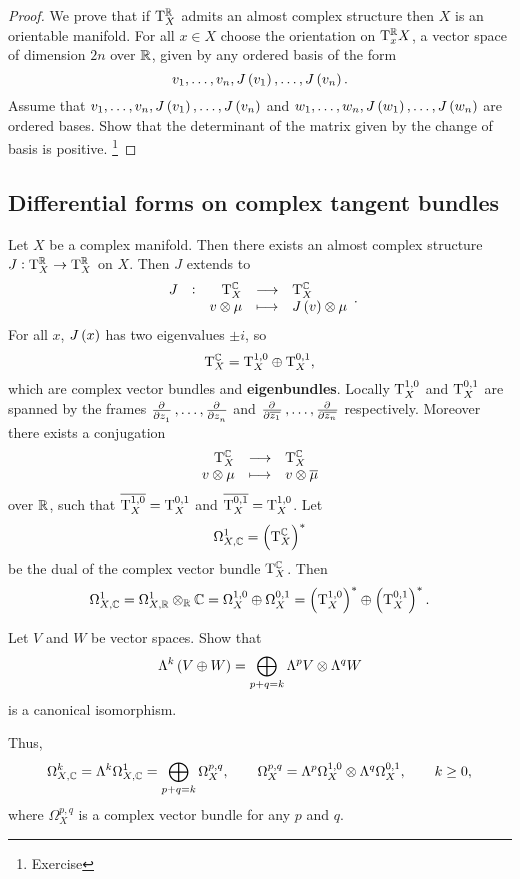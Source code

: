 \begin{proof}
We prove that if $ \mathrm{T}_X^{\mathbb{R}} $ admits an almost complex structure then $ X $ is an orientable manifold. For all $ x \in X $ choose the orientation on $ \mathrm{T}_x^{\mathbb{R}} X $, a vector space of dimension $ 2n $ over $ \mathbb{R} $, given by any ordered basis of the form
$$ v_1, \dots, v_n, J\br{v_1}, \dots, J\br{v_n}. $$
Assume that $ v_1, \dots, v_n, J\br{v_1}, \dots, J\br{v_n} $ and $ w_1, \dots, w_n, J\br{w_1}, \dots, J\br{w_n} $ are ordered bases. Show that the determinant of the matrix given by the change of basis is positive. \footnote{Exercise}
\end{proof}

\pagebreak

\subsection{Differential forms on complex tangent bundles}

Let $ X $ be a complex manifold. Then there exists an almost complex structure $ J : \mathrm{T}_X^{\mathbb{R}} \to \mathrm{T}_X^{\mathbb{R}} $ on $ X $. Then $ J $ extends to
$$ \function[J]{\T_X^\CC}{\T_X^\CC}{v \otimes \mu}{J\br{v} \otimes \mu}. $$
For all $ x $, $ J\br{x} $ has two eigenvalues $ \pm i $, so
$$ \mathrm{T}_X^{\mathbb{C}} = \mathrm{T}_X^{1, 0} \oplus \mathrm{T}_X^{0, 1}, $$
which are complex vector bundles and \textbf{eigenbundles}. Locally $ \mathrm{T}_X^{1, 0} $ and $ \mathrm{T}_X^{0, 1} $ are spanned by the frames $ \tpd{}{z_1}, \dots, \tpd{}{z_n} $ and $ \tpd{}{\overline{z_1}}, \dots, \tpd{}{\overline{z_n}} $ respectively. Moreover there exists a conjugation
$$ \function{\T_X^\CC}{\T_X^\CC}{v \otimes \mu}{v \otimes \overline{\mu}} $$
over $ \mathbb{R} $, such that $ \overline{\mathrm{T}_X^{1, 0}} = \mathrm{T}_X^{0, 1} $ and $ \overline{\mathrm{T}_X^{0, 1}} = \mathrm{T}_X^{1, 0} $. Let
$$ \Omega_{X, \CC}^1 = \br{\T_X^\CC}^* $$
be the dual of the complex vector bundle $ \mathrm{T}_X^{\mathbb{C}} $. Then
$$ \Omega_{X, \CC}^1 = \Omega_{X, \RR}^1 \otimes_\RR \CC = \Omega_X^{1, 0} \oplus \Omega_X^{0, 1} = \br{\T_X^{1, 0}}^* \oplus \br{\T_X^{0, 1}}^*. $$

\begin{exercise*}
Let $ V $ and $ W $ be vector spaces. Show that
$$ \Lambda^k\br{V \oplus W} = \bigoplus_{p + q = k} \Lambda^pV \otimes \Lambda^qW $$
is a canonical isomorphism.
\end{exercise*}


Thus,
$$ \Omega_{X, \mathbb{C}}^k = \Lambda^k\Omega_{X, \mathbb{C}}^1 = \bigoplus_{p + q = k} \Omega_X^{p, q}, \qquad \Omega_X^{p, q} = \Lambda^p\Omega_X^{1, 0} \otimes \Lambda^q\Omega_X^{0, 1}, \qquad k \ge 0, $$
where $ \Omega_X^{p, q} $ is a complex vector bundle for any $ p $ and $ q $.

